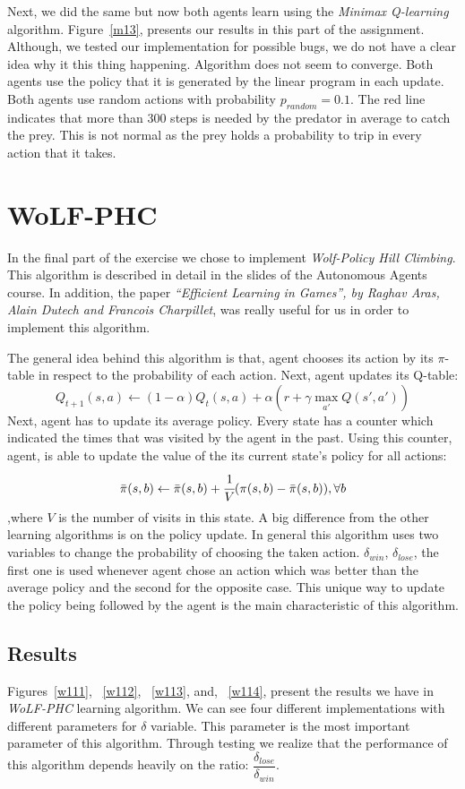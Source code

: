 \documentclass[a4paper,11pt]{article}
\begin{document}
Next, we did the same but now both agents learn using the \textit{Minimax Q-learning} algorithm. Figure~\ref{m13},  presents our results in this part of the assignment. Although, we tested our implementation for possible bugs, we do not have a clear idea why it this thing happening. Algorithm does not seem to converge. Both agents use the policy that it is generated by the linear program in each update. Both agents use random actions with probability $p_{random} = 0.1$. The red line indicates that more than 300 steps is needed by the predator in average to catch the prey. This is not normal as the prey holds a probability to trip in every action that it takes.


\section{WoLF-PHC}
In the final part of the exercise we chose to implement \textit{Wolf-Policy Hill Climbing}. This algorithm is described in detail in the slides of the Autonomous Agents course. In addition, the paper \textit{``Efficient Learning in Games'', by Raghav Aras, Alain Dutech and Francois Charpillet}, was really useful for us in order to implement this algorithm.

The general idea behind this algorithm is that, agent chooses its action by its $\pi$-table in respect to the probability of each action. Next, agent updates its Q-table:
\[
Q_{t+1}(s,a) \leftarrow (1-\alpha)Q_{t}(s,a)+\alpha(r + \gamma \max_{a'}Q(s',a'))
\]
Next, agent has to update its average policy. Every state has a counter which indicated the times that was visited by the agent in the past. Using this counter, agent, is able to update the value of the its current state's policy for all actions:
\[
\bar{\pi}(s,b) \leftarrow \bar{\pi}(s,b) + \cfrac{1}{V} (\pi(s,b) - \bar{\pi}(s,b)), \forall b
\]
,where $V$ is the number of visits in this state. A big difference from the other learning algorithms is on the policy update. In general this algorithm uses two variables to change the probability of choosing the taken action. $\delta_{win}$, $\delta_{lose}$, the first one is used whenever agent chose an action which was better than the average policy and the second for the opposite case. This unique way to update the policy being followed by the agent is the main characteristic of this algorithm.


\subsection{Results}
Figures~\ref{w111}, ~\ref{w112}, ~\ref{w113}, and, ~\ref{w114}, present the results we have in \textit{WoLF-PHC} learning algorithm. We can see four different implementations with different parameters for $\delta$ variable. This parameter is the most important parameter of this algorithm. Through testing we realize that the performance of this algorithm depends heavily on the ratio: $\dfrac{\delta_{lose}}{\delta_{win}}$.
\end{document}
